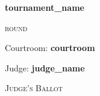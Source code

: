 \documentclass{article}
\begin{document}
\begin{center}
    \vspace{2em}
    {\LARGE\textbf{{{ tournament_name }}}}
    
    \vspace{1.2em}
    {\large\textsc{{{ round }}}}
    
    \vspace{0.8em}
    {\large Courtroom: \textbf{{{ courtroom }}}}
    
    \vspace{1em}
    {\large Judge: \textbf{{{ judge_name }}}}
    \vspace{1.5em}
\end{center}

\begin{center}
    \vspace{0.5em}
    {\large\textsc{Judge's Ballot}}
\end{center}
\end{document}
